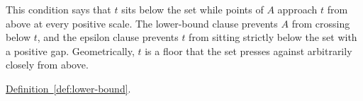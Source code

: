 \begin{remark*}[Interpretation]
This condition says that $t$ sits below the set while points of $A$ approach $t$ from above at every positive scale. The lower-bound clause prevents $A$ from crossing below $t$, and the epsilon clause prevents $t$ from sitting strictly below the set with a positive gap. Geometrically, $t$ is a floor that the set presses against arbitrarily closely from above.
\end{remark*}

\begin{remark*}[Dependencies]
\hyperref[def:lower-bound]{Definition~\ref*{def:lower-bound}}.
\end{remark*}



